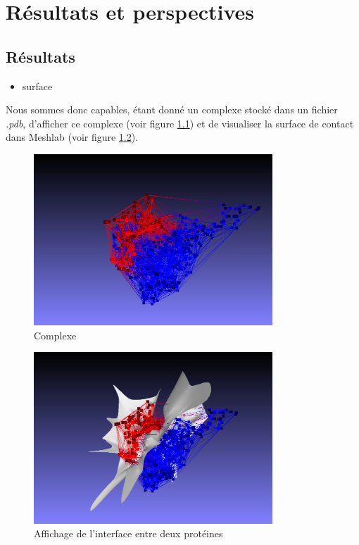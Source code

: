 \chapter{Résultats et perspectives}

\section{Résultats}

\begin{itemize}
  \item surface
\end{itemize}

Nous sommes donc capables, étant donné un complexe stocké dans un fichier \textit{.pdb},
d'afficher ce complexe (voir figure \ref{fig::complexe}) et de visualiser la surface
de contact dans Meshlab (voir figure \ref{fig::affichage_final}).

\begin{figure}[ht]
\centering
  \includegraphics[width=0.8\textwidth]{figures/final_no_surf.png}
  \caption{Complexe}
  \label{fig::complexe}
\end{figure}

\begin{figure}[ht]
\centering
  \includegraphics[width=0.8\textwidth]{figures/final_with_surf.png}
  \caption{Affichage de l'interface entre deux protéines}
  \label{fig::affichage_final}
\end{figure}


